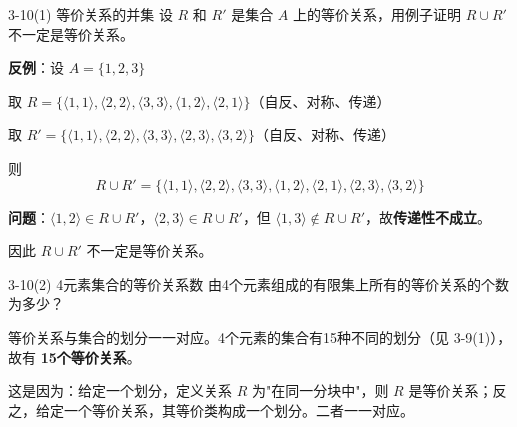 \documentclass[11pt]{article}
\begin{document}
\begin{question}{3-10(1) 等价关系的并集}
  设 $R$ 和 $R'$ 是集合 $A$ 上的等价关系，用例子证明 $R \cup R'$ 不一定是等价关系。

  \begin{answer}
    \textbf{反例}：设 $A = \{1, 2, 3\}$

    取 $R = \{\langle 1,1\rangle, \langle 2,2\rangle, \langle 3,3\rangle, \langle 1,2\rangle, \langle 2,1\rangle\}$（自反、对称、传递）

    取 $R' = \{\langle 1,1\rangle, \langle 2,2\rangle, \langle 3,3\rangle, \langle 2,3\rangle, \langle 3,2\rangle\}$（自反、对称、传递）

    则
    $$R \cup R' = \{\langle 1,1\rangle, \langle 2,2\rangle, \langle 3,3\rangle, \langle 1,2\rangle, \langle 2,1\rangle, \langle 2,3\rangle, \langle 3,2\rangle\}$$

    \vspace{0.5em}
    \textbf{问题}：$\langle 1,2\rangle \in R \cup R'$，$\langle 2,3\rangle \in R \cup R'$，但 $\langle 1,3\rangle \notin R \cup R'$，故\textbf{传递性不成立}。

    因此 $R \cup R'$ 不一定是等价关系。
  \end{answer}
\end{question}


\begin{question}{3-10(2) 4元素集合的等价关系数}
  由4个元素组成的有限集上所有的等价关系的个数为多少？

  \begin{answer}
    等价关系与集合的划分一一对应。4个元素的集合有15种不同的划分（见 3-9(1)），故有 \textbf{15个等价关系}。

    \begin{info}[说明:]
      这是因为：给定一个划分，定义关系 $R$ 为"在同一分块中"，则 $R$ 是等价关系；反之，给定一个等价关系，其等价类构成一个划分。二者一一对应。
    \end{info}
  \end{answer}
\end{question}

\end{document}
